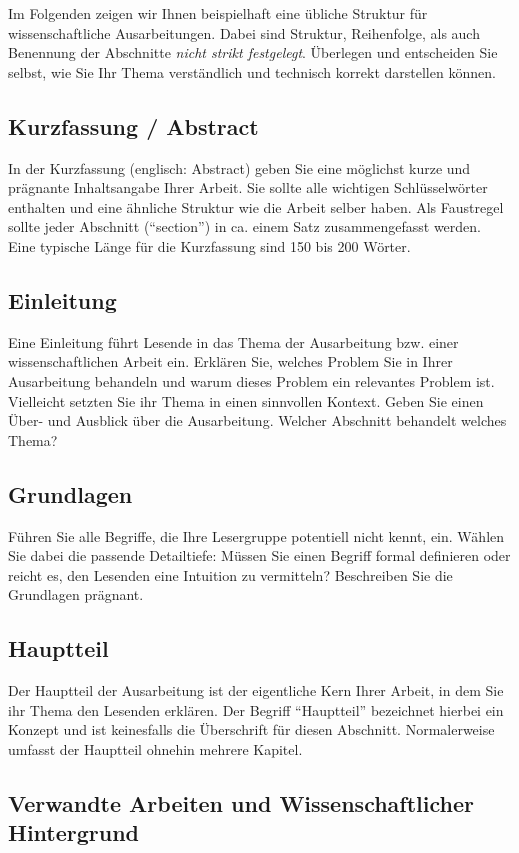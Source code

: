 \documentclass[lang=english]{secseminar}
\begin{document}
Im Folgenden zeigen wir Ihnen beispielhaft eine übliche Struktur für wissenschaftliche
Ausarbeitungen. Dabei sind Struktur, Reihenfolge, als auch Benennung der Abschnitte \emph{nicht
  strikt festgelegt}. Überlegen und entscheiden Sie selbst, wie Sie Ihr Thema verständlich und
technisch korrekt darstellen können.

\subsection{Kurzfassung / Abstract}
In der Kurzfassung (englisch: Abstract) geben Sie eine möglichst kurze und prägnante Inhaltsangabe
Ihrer Arbeit.
Sie sollte alle wichtigen Schlüsselwörter enthalten und eine ähnliche Struktur wie die Arbeit selber
haben.
Als Faustregel sollte jeder Abschnitt (``section'') in ca. einem Satz zusammengefasst werden.
Eine typische Länge für die Kurzfassung sind 150 bis 200 Wörter.

\subsection{Einleitung}
Eine Einleitung führt Lesende in das Thema der Ausarbeitung bzw. einer wissenschaftlichen Arbeit
ein. Erklären Sie, welches Problem Sie in Ihrer Ausarbeitung behandeln und warum dieses Problem ein
relevantes Problem ist. Vielleicht setzten Sie ihr Thema in einen sinnvollen Kontext. Geben Sie
einen Über- und Ausblick über die Ausarbeitung. Welcher Abschnitt behandelt welches Thema?

\subsection{Grundlagen}
Führen Sie alle Begriffe, die Ihre Lesergruppe potentiell nicht kennt, ein. Wählen Sie dabei die
passende Detailtiefe: Müssen Sie einen Begriff formal definieren oder reicht es, den Lesenden eine
Intuition zu vermitteln? Beschreiben Sie die Grundlagen prägnant.

\subsection{Hauptteil}
Der Hauptteil der Ausarbeitung ist der eigentliche Kern Ihrer Arbeit, in dem Sie ihr Thema den Lesenden
erklären. Der Begriff ``Hauptteil'' bezeichnet hierbei ein Konzept und ist keinesfalls die
Überschrift für diesen Abschnitt. Normalerweise umfasst der Hauptteil ohnehin mehrere Kapitel.

\subsection{Verwandte Arbeiten und Wissenschaftlicher Hintergrund}
\end{document}
